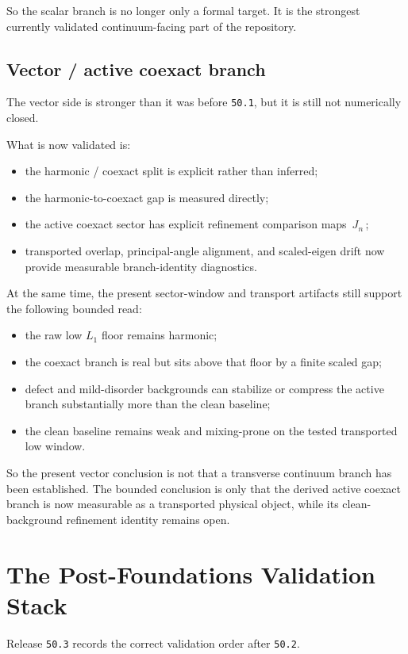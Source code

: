 \documentclass[11pt]{article}
\begin{document}
So the scalar branch is no longer only a formal target. It is the strongest currently validated continuum-facing part of the repository.

\subsection{Vector / active coexact branch}

The vector side is stronger than it was before \texttt{50.1}, but it is still not numerically closed.

What is now validated is:
\begin{itemize}
\item the harmonic / coexact split is explicit rather than inferred;
\item the harmonic-to-coexact gap is measured directly;
\item the active coexact sector has explicit refinement comparison maps \(\,J_n\,\);
\item transported overlap, principal-angle alignment, and scaled-eigen drift now provide measurable branch-identity diagnostics.
\end{itemize}

At the same time, the present sector-window and transport artifacts still support the following bounded read:
\begin{itemize}
\item the raw low \(L_1\) floor remains harmonic;
\item the coexact branch is real but sits above that floor by a finite scaled gap;
\item defect and mild-disorder backgrounds can stabilize or compress the active branch substantially more than the clean baseline;
\item the clean baseline remains weak and mixing-prone on the tested transported low window.
\end{itemize}

So the present vector conclusion is not that a transverse continuum branch has been established. The bounded conclusion is only that the derived active coexact branch is now measurable as a transported physical object, while its clean-background refinement identity remains open.

\section{The Post-Foundations Validation Stack}

Release \texttt{50.3} records the correct validation order after \texttt{50.2}.
\end{document}
